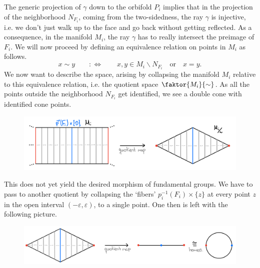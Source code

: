 The generic projection of \(\gamma\) down to the orbifold \(P_i\) implies that in the projection of the neighborhood \(N_{F_i}\), coming from the two-sidedness, the ray \(\gamma\) is injective, i.e. we don't just walk up to the face and go back without getting reflected. %
As a consequence, in the manifold \(M_i\), the ray \(\gamma\) has to really intersect the preimage of \(F_i\).
We will now proceed by defining an equivalence relation on points in \(M_i\) as follows.
\begin{equation*}
    x \sim y  \qquad :\iff \qquad x, y \in M_i \backslash N_{F_i} \quad\text{or}\quad x = y.
\end{equation*}
We now want to describe the space, arising by collapsing the manifold \(M_i\) relative to this equivalence relation, i.e. the quotient space \(\faktor{M_i}{\sim}\).
As all the points outside the neighborhood \(N_{F_i}\) get identified, we see a double cone with identified cone points.
\begin{figure}[h!]
    \label{fig:doublecone}
    \centering
    \includegraphics[width=.8\textwidth]{gfx/Quotient 1.png}
\end{figure}

This does not yet yield the desired morphism of fundamental groups.
We have to pass to another quotient by collapsing the `fibers' \(p_i^{-1}(F_i) \times \{z\}\) at every point \(z\) in the open interval \((-\varepsilon, \varepsilon)\), to a single point.
One then is left with the following picture.
\begin{figure}[h!]
    \label{fig:circle}
    \centering
    \includegraphics[width=.9\textwidth]{gfx/Quotient 2.png}
\end{figure}

